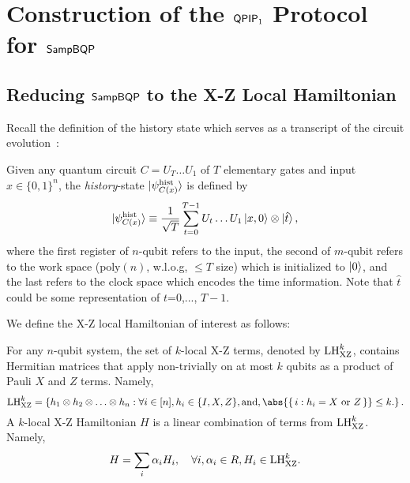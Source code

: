 \section{Construction of the $\operatorname{\mathsf{QPIP}}_1$ Protocol for $\operatorname{\mathsf{SampBQP}}$}
\label{sec:sampbqp}

\subsection{Reducing $\operatorname{\mathsf{SampBQP}}$ to the X-Z Local Hamiltonian} \label{sec:LHXZ}

Recall the definition of the history state which serves as a transcript of the circuit evolution~\cite{kitaev2002classical}:

\begin{dfn}
    \label{dfn:groundstate}    
    Given any quantum circuit $C=U_T\ldots U_1$ of $T$ elementary gates and input $x\in\{0,1\}^n$, the \emph{history}-state $\ket{\psi_{C(x)}^{\mathrm{hist}}}$ is defined by
    \begin{equation}
        \ket{\psi_{C(x)}^{\mathrm{hist}}} \equiv \frac{1}{\sqrt{T}}\sum_{t=0}^{T-1}U_t\ldots U_1\ket{x,0}\otimes\ket{\hat{t}},
    \end{equation}
    where the first register of $n$-qubit refers to the input, the second of $m$-qubit refers to the work space ($\mathrm{poly}(n)$, w.l.o.g, $\leq T$ size) which is initialized to $\ket{0}$, and the last refers to the clock space which encodes the time information. Note that $\hat{t}$ could be some representation of $t$=0,..., $T-1$.
\end{dfn}

We define the X-Z local Hamiltonian of interest as follows:

\begin{dfn} For any $n$-qubit system, the set of $k$-local X-Z terms, denoted by $\mathrm{LH}_{\mathrm{XZ}}^{k}$, contains Hermitian matrices that apply non-trivially on at most $k$ qubits as a product of Pauli $X$ and $Z$ terms. Namely,
\begin{equation}
  \LHXZ{k} = \left\{h_1 \otimes h_2 \otimes \ldots \otimes h_n: \forall i \in [n], h_i \in \{I, X, Z\}, \text{and}, \abs{\set{i: h_i=X \text{ or }Z}} \leq k. \right \}.
\end{equation}
A $k$-local X-Z Hamiltonian $H$ is a linear combination of terms from $\mathrm{LH}_{\mathrm{XZ}}^{k}$. Namely,
\begin{equation}
  H = \sum_i \alpha_{i} H_i,  \quad \forall i, \alpha_i \in R,  H_i \in \mathrm{LH}_{\mathrm{XZ}}^{k}.
\end{equation}
\end{dfn}

